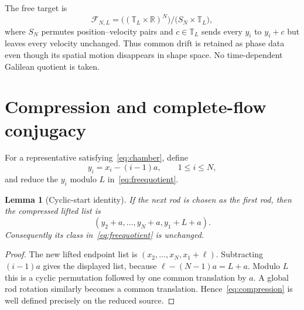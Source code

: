 \documentclass[10pt]{article}
\newtheorem{lemma}{Lemma}
\newcommand{\R}{\mathbb R}
\newcommand{\T}{\mathbb T}
\newcommand{\cF}{\mathcal F}
\begin{document}
The free target is
\begin{equation}\label{eq:freequotient}
 \cF_{N,L}=\bigl((\T_L\times\R)^N\bigr)
 \big/\bigl(S_N\times\T_L\bigr),
\end{equation}
where $S_N$ permutes position--velocity pairs and $c\in\T_L$ sends every
$y_i$ to $y_i+c$ but leaves every velocity unchanged.  Thus common drift is
retained as phase data even though its spatial motion disappears in shape
space.  No time-dependent Galilean quotient is taken.

\section{Compression and complete-flow conjugacy}
For a representative satisfying~\eqref{eq:chamber}, define
\begin{equation}\label{eq:compression}
 y_i=x_i-(i-1)a,\qquad 1\leq i\leq N,
\end{equation}
and reduce the $y_i$ modulo $L$ in~\eqref{eq:freequotient}.

\begin{lemma}[Cyclic-start identity]\label{lem:cyclic}
If the next rod is chosen as the first rod, then the compressed lifted list is
\[
 (y_2+a,\ldots,y_N+a,y_1+L+a).
\]
Consequently its class in~\eqref{eq:freequotient} is unchanged.
\end{lemma}
\begin{proof}
The new lifted endpoint list is
$(x_2,\ldots,x_N,x_1+\ell)$.  Subtracting $(i-1)a$ gives the displayed list,
because $\ell-(N-1)a=L+a$.  Modulo $L$ this is a cyclic permutation followed
by one common translation by $a$.  A global rod rotation similarly becomes a
common translation.  Hence~\eqref{eq:compression} is well defined precisely
on the reduced source.
\end{proof}
\end{document}
